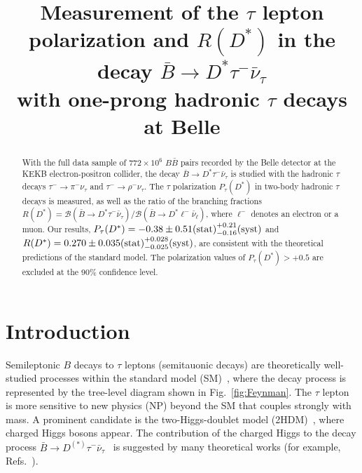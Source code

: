 \documentclass[aps,prd,twocolumn,superscriptaddress,showpacs,preprintnumbers,amsmath,amssymb]{revtex4-1}
\begin{document}

\title{Measurement of the $\tau$ lepton polarization and $R(D^*)$ in the decay $\bar{B} \rightarrow D^* \tau^- \bar{\nu}_\tau$\\
  with one-prong hadronic $\tau$ decays at Belle}



\begin{abstract}
  With the full data sample of $772 \times 10^6$ $B{\bar B}$ pairs recorded by the Belle detector at the KEKB electron-positron collider, the decay $\bar{B} \rightarrow D^* \tau^- \bar{\nu}_\tau$ is studied with the hadronic $\tau$ decays $\tau^- \rightarrow \pi^- \nu_\tau$ and $\tau^- \rightarrow \rho^- \nu_\tau$. The $\tau$ polarization $P_\tau(D^*)$ in two-body hadronic $\tau$ decays is measured, as well as the ratio of the branching fractions $R(D^{*}) = \mathcal{B}(\bar {B} \rightarrow D^* \tau^- \bar{\nu}_\tau) / \mathcal{B}(\bar{B} \rightarrow D^* \ell^- \bar{\nu}_\ell)$, where $\ell^-$ denotes an electron or a muon. Our results, $P_\tau(D^*) = -0.38 \pm 0.51 {\rm (stat)} ^{+0.21} _{-0.16} {\rm (syst)}$ and $R(D^*) = 0.270 \pm 0.035{\rm (stat)} ^{+0.028}_{-0.025}{\rm (syst)}$, are consistent with the theoretical predictions of the standard model. The polarization values of $P_\tau(D^*) > +0.5$ are excluded at the 90\% confidence level.
\end{abstract}


\maketitle

\tighten

{\renewcommand{\thefootnote}{\fnsymbol{footnote}}}
\setcounter{footnote}{0}


\section{Introduction}

Semileptonic $B$ decays to $\tau$ leptons (semitauonic decays) are theoretically well-studied processes within the standard model (SM)~\cite{cite:Heiliger:1989, cite:Korner:1990, cite:Hwang:2000}, where the decay process is represented by the tree-level diagram shown in Fig.~\ref{fig:Feynman}. The $\tau$ lepton is more sensitive to new physics (NP) beyond the SM that couples strongly with mass. A prominent candidate is the two-Higgs-doublet model (2HDM)~\cite{cite:2HDM:1989}, where charged Higgs bosons appear. The contribution of the charged Higgs to the decay process $\bar{B} \to D^{(*)} \tau^- \bar{\nu}_\tau$~\cite{cite:CC} is suggested by many theoretical works (for example, Refs.~\cite{cite:Grzadkowski:1992,cite:Tanaka:1995,cite:Soni:1997,cite:Itoh:2005,cite:Crivellin:2012}).
\end{document}
